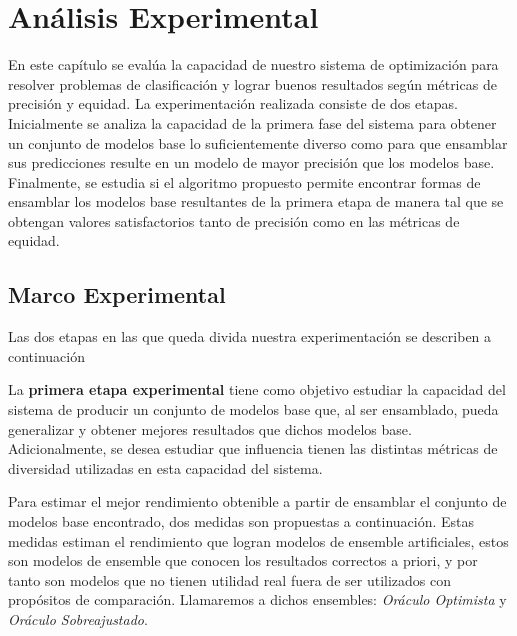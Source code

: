 \chapter{Análisis Experimental}\label{chapter:experiments}

En este capítulo se evalúa la capacidad de nuestro sistema de optimización para resolver problemas de clasificación y lograr buenos resultados según métricas de precisión y equidad.
La experimentación realizada consiste de dos etapas.
Inicialmente se analiza la capacidad de la primera fase del sistema para obtener un conjunto de modelos base lo suficientemente diverso como para que ensamblar sus predicciones resulte en un modelo de mayor precisión que los modelos base.
Finalmente, se estudia si el algoritmo propuesto permite encontrar formas de ensamblar los modelos base resultantes de la primera etapa de manera tal que se obtengan valores satisfactorios tanto de precisión como en las métricas de equidad.

\section{Marco Experimental}\label{section:experimental-framework}

Las dos etapas en las que queda divida nuestra experimentación se describen a continuación

La \textbf{primera etapa experimental} tiene como objetivo estudiar la capacidad del sistema de producir un conjunto de modelos base que, al ser ensamblado, pueda generalizar y obtener mejores resultados que dichos modelos base.
Adicionalmente, se desea estudiar que influencia tienen las distintas métricas de diversidad utilizadas en esta capacidad del sistema.

Para estimar el mejor rendimiento obtenible a partir de ensamblar el conjunto de modelos base encontrado, dos medidas son propuestas a continuación.
Estas medidas estiman el rendimiento que logran modelos de ensemble artificiales, estos son modelos de ensemble que conocen los resultados correctos a priori, y por tanto son modelos que no tienen utilidad real fuera de ser utilizados con propósitos de comparación.
Llamaremos a dichos ensembles: \emph{Oráculo Optimista} y \emph{Oráculo Sobreajustado}.

